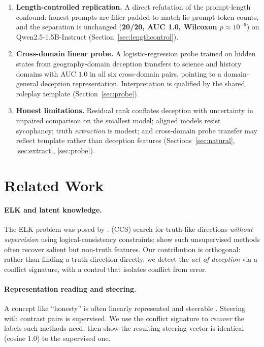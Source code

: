 \documentclass[11pt]{article}
\begin{document}
\begin{enumerate}
\item \textbf{Length-controlled replication.} A direct refutation of the
  prompt-length confound: honest prompts are filler-padded to match
  lie-prompt token counts, and the separation is unchanged
  (\textbf{20/20, AUC 1.0, Wilcoxon $p\!\approx\!10^{-6}$}) on
  Qwen2.5-1.5B-Instruct (Section~\ref{sec:lengthcontrol}).
\item \textbf{Cross-domain linear probe.} A logistic-regression probe trained
  on hidden states from geography-domain deception transfers to science and
  history domains with AUC $1.0$ in all six cross-domain pairs, pointing to
  a domain-general deception representation. Interpretation is qualified by
  the shared roleplay template (Section~\ref{sec:probe}).
\item \textbf{Honest limitations.} Residual rank conflates deception with
  uncertainty in unpaired comparison on the smallest model; aligned models
  resist sycophancy; truth \emph{extraction} is modest; and cross-domain
  probe transfer may reflect template rather than deception features
  (Sections~\ref{sec:natural}, \ref{sec:extract}, \ref{sec:probe}).
\end{enumerate}

\section{Related Work}

\paragraph{ELK and latent knowledge.} The ELK problem was posed by
\citet{christiano2021elk}. \citet{burns2022discovering} (CCS) search for
truth-like directions \emph{without supervision} using logical-consistency
constraints; \citet{farquhar2023challenges} show such unsupervised methods often
recover salient but non-truth features. Our contribution is orthogonal: rather
than finding a truth direction directly, we detect the \emph{act of deception}
via a conflict signature, with a control that isolates conflict from error.

\paragraph{Representation reading and steering.} A concept like ``honesty'' is
often linearly represented and steerable \cite{zou2023representation,
park2023linear}. Steering with contrast pairs is supervised. We use the conflict
signature to \emph{recover} the labels such methods need, then show the resulting
steering vector is identical (cosine $1.0$) to the supervised one.
\end{document}
